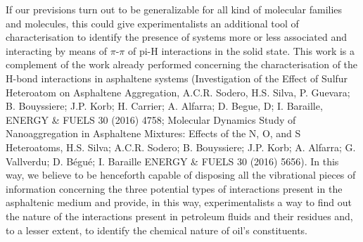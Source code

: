 If our previsions turn out to be generalizable for all kind of molecular families and molecules, this could give experimentalists an additional tool of characterisation to identify the presence of systems more or less associated and interacting by means of $\pi$-$\pi$ of pi-H interactions in the solid state. This work is a complement of the work already performed concerning the characterisation of the H-bond interactions in asphaltene systems (Investigation of the Effect of Sulfur Heteroatom on Asphaltene Aggregation, A.C.R. Sodero, H.S. Silva, P. Guevara; B. Bouyssiere; J.P. Korb; H. Carrier; A. Alfarra; D. Begue, D; I. Baraille,  ENERGY \& FUELS 30 (2016) 4758; Molecular Dynamics Study of Nanoaggregation in Asphaltene Mixtures: Effects of the N, O, and S Heteroatoms, H.S. Silva; A.C.R. Sodero; B. Bouyssiere; J.P. Korb; A. Alfarra; G. Vallverdu; D. Bégué; I. Baraille ENERGY \& FUELS 30 (2016) 5656). In this way, we believe to be henceforth capable of disposing all the vibrational pieces of information concerning the three potential types of interactions present in the asphaltenic medium and provide, in this way, experimentalists a way to find out the nature of the interactions present in petroleum fluids and their residues and, to a lesser extent, to identify the chemical nature of oil’s constituents. 
 




 





